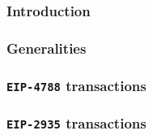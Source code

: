 \subsubsection{Introduction                     \lispNone{}}   \label{hub: tx skip: sysi: intro}          
\subsubsection{Generalities                     \lispTodo{}}   \label{hub: tx skip: sysi: generalities}   
\subsubsection{\texttt{EIP-4788} transactions   \lispTodo{}}   \label{hub: tx skip: sysi: eip 4788}       
\subsubsection{\texttt{EIP-2935} transactions   \lispTodo{}}   \label{hub: tx skip: sysi: eip 2935}       
